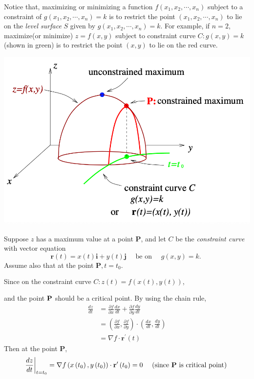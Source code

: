 \documentclass[11pt, a4paper]{MATH2023}
\begin{document}
\begin{spacing}{1.3}
    Notice that, maximizing or minimizing a function $f(x_1,x_2,\cdots,x_n)$
    subject to a constraint of $g(x_1,x_2,\cdots,x_n)=k$ is to restrict 
    the point $(x_1,x_2,\cdots,x_n)$ to lie on the {\it level surface} $S$
    given by $g(x_1,x_2,\cdots,x_n)=k$. For example, if $n=2$, 
    maximize(or minimize) $z=f(x,y)$ subject to constraint curve $C:g(x,y)=k$
    (shown in {\green green}) is to restrict the point $(x,y)$ to lie on the {\red red} curve.
    \begin{center}
        \includegraphics[scale=0.45]{images/Ch13-lag-proof.png}
    \end{center}
    Suppose $z$ has a maximum value at a point $\mathbf{P}$, and let $C$ be the {\it constraint curve} 
    with vector equation
    $$\mathbf{r}(t)=x(t) \mathbf{i}+y(t) \mathbf{j} \quad \text { be on } \quad g(x, y)=k \text {. }$$
    Assume also that at the point $\mathbf{P}, t=t_{0}$. 
    
    Since on the constraint curve $C: z(t)=f(x(t), y(t))$,

    and the point $\bf P$ should be a critical point. By using the chain rule,
    $$\begin{aligned}
    \frac{d z}{d t} &=\frac{\partial f}{\partial x} \frac{d x}{d t}+\frac{\partial f}{\partial y} \frac{d y}{d t} \\
    &=\left(\frac{\partial f}{\partial x}, \frac{\partial f}{\partial y}\right) \cdot\left(\frac{d x}{d t}, \frac{d y}{d t}\right) \\
    &=\nabla f \cdot \mathbf{r}^{\prime}(t)
    \end{aligned}$$
    Then at the point $\mathbf{P}$,
    $$\left.\frac{d z}{d t}\right|_{t=t_{0}}=\nabla f\left(x\left(t_{0}\right), y\left(t_{0}\right)\right) 
    \cdot \mathbf{r}^{\prime}\left(t_{0}\right)=0 \quad \text { (since {\bf P} is critical point) }$$


\end{spacing}
\end{document}
